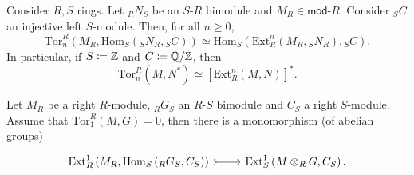 \begin{prop}
	Consider $R,S$ rings.
	Let ${}_RN_S$ be an $S$-$R$ bimodule and $M_R \in \mathsf{mod}\text{-}R$.
	Consider ${}_SC$ an injective left $S$-module.
	Then, for all $n \geq 0$,
	\begin{equation}
		\mathrm{Tor}^{ R}_{ n}
		\left( M_R, \mathrm{Hom}_{ S}\left( {}_SN_R, {}_SC \right) \right) \simeq
		\mathrm{Hom}_{ S}\left( \mathrm{Ext}^{ n}_{ R} \left( M_R, {}_SN_R \right), {}_SC \right)
	.\end{equation} 
	In particular, if $S \coloneqq \mathbb{Z}$ and $C \coloneqq \mathbb{Q}/\mathbb{Z}$, then
	\begin{equation}
		\mathrm{Tor}^{ R}_{ n} \left( M, N^* \right) \simeq
		\left[ \mathrm{Ext}^{ n}_{ R} \left( M, N \right) \right]^*
	.\end{equation} 
\end{prop} 

\begin{ex}
	Let $M_R$ be a right $R$-module,
	${}_RG_S$ an $R$-$S$ bimodule and $C_S$ a right $S$-module.
	Assume that $\mathrm{Tor}^{ R}_{ 1} \left( M, G \right) = 0$, then
	there is a monomorphism (of abelian groups)
	\begin{equation*}
	\begin{tikzcd}
		\mathrm{Ext}^{ 1}_{ R} \left( M_R, \mathrm{Hom}_{ S}\left( {}_RG_S, C_S \right) \right)
		\arrow[r, "", rightarrowtail] &
		\mathrm{Ext}^{ 1}_{ S} \left( M \otimes_R G, C_S \right)
	.\end{tikzcd}
	\end{equation*}
\end{ex} 
